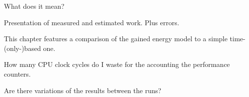 \label{sec:evaluation}

What does it mean?



\label{sec:error}

Presentation of measured and estimated work. Plus errors.


\label{sec:time-based}

This chapter features a comparison of the gained energy model to a simple
time-(only-)based one.


\label{sec:overhead}

How many CPU clock cycles do I waste for the accounting the performance
counters.


\label{sec:variation}

Are there variations of the results between the runs?
